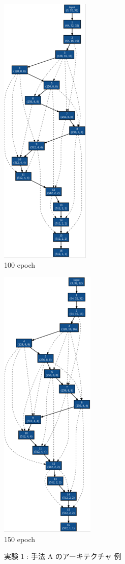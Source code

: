 \begin{figure}[tb]
\begin{minipage}{0.3\hsize}
\begin{center}
    \includegraphics[clip,scale=0.8]{./fig/04.exp/a100.png}\\
    100 epoch
 	\end{center}
 \end{minipage}
 \begin{minipage}{0.3\hsize}
 	\begin{center}
    \includegraphics[clip,scale=0.8]{./fig/04.exp/a150.png}\\
    150 epoch
 	\end{center}
 \end{minipage}
 \caption{実験 1 : 手法 A のアーキテクチャ 例}
 \label{fig:exp1_a}
\end{figure}


